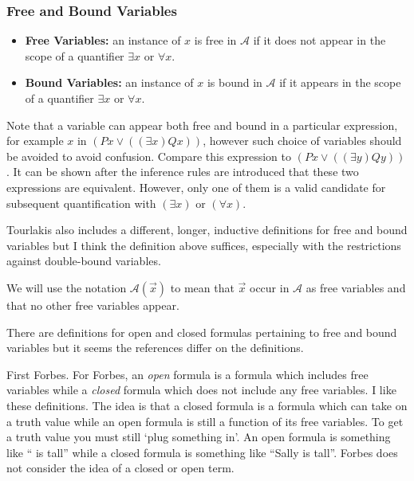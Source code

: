 \documentclass[12pt]{article}
\newcommand{\mc}[1]{\mathcal{#1}}
\begin{document}
\hrulefill

\subsubsection*{Free and Bound Variables}
\begin{itemize}
\item{\textbf{Free Variables:} an instance of $x$ is free in $\mathcal{A}$ if it does not appear in the scope of a quantifier $\exists x$ or $\forall x$.}
\item{\textbf{Bound Variables:} an instance of $x$ is bound in $\mathcal{A}$ if it appears in the scope of a quantifier $\exists x$ or $\forall x$.}
\end{itemize}

\hrulefill

Note that a variable can appear both free and bound in a particular expression, for example $x$ in $(Px \lor ((\exists x)Qx))$, however such choice of variables should be avoided to avoid confusion. Compare this expression to $(Px \lor ((\exists y)Qy))$. It can be shown after the inference rules are introduced that these two expressions are equivalent. However, only one of them is a valid candidate for subsequent quantification with $(\exists x)$ or $(\forall x)$.

Tourlakis also includes a different, longer, inductive definitions for free and bound variables but I think the definition above suffices, especially with the restrictions against double-bound variables.

We will use the notation $\mc{A}(\vec{x})$ to mean that $\vec{x}$ occur in $\mc{A}$ as free variables and that no other free variables appear.

There are definitions for open and closed formulas pertaining to free and bound variables but it seems the references differ on the definitions.

First Forbes. For Forbes, an \textit{open} formula is a formula which includes free variables while a \textit{closed} formula which does not include any free variables. I like these definitions. The idea is that a closed formula is a formula which can take on a truth value while an open formula is still a function of its free variables. To get a truth value you must still `plug something in'. An open formula is something like ``\underline{\hspace{0.75cm}} is tall'' while a closed formula is something like ``Sally is tall''. Forbes does not consider the idea of a closed or open term.
\end{document}
